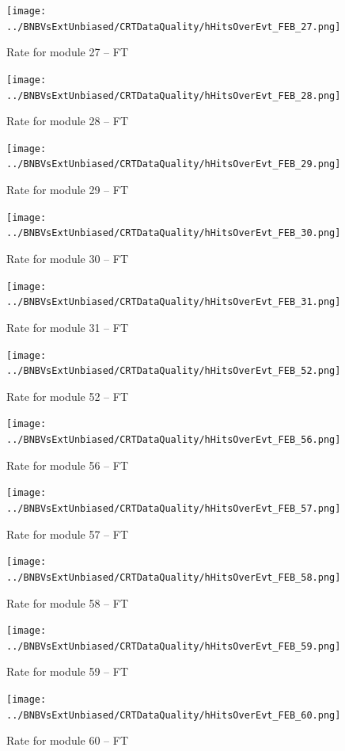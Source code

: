 \begin{figure}[h!]
\centering
\texttt{[image: ../BNBVsExtUnbiased/CRTDataQuality/hHitsOverEvt\_FEB\_27.png]}
\caption{Rate for module 27 -- FT}
\label{Annual27}
\end{figure}
\begin{figure}[h!]
\centering
\texttt{[image: ../BNBVsExtUnbiased/CRTDataQuality/hHitsOverEvt\_FEB\_28.png]}
\caption{Rate for module 28 -- FT}
\label{Annual28}
\end{figure}
\begin{figure}[h!]
\centering
\texttt{[image: ../BNBVsExtUnbiased/CRTDataQuality/hHitsOverEvt\_FEB\_29.png]}
\caption{Rate for module 29 -- FT}
\label{Annual29}
\end{figure}
\begin{figure}[h!]
\centering
\texttt{[image: ../BNBVsExtUnbiased/CRTDataQuality/hHitsOverEvt\_FEB\_30.png]}
\caption{Rate for module 30 -- FT}
\label{Annual30}
\end{figure}
\begin{figure}[h!]
\centering
\texttt{[image: ../BNBVsExtUnbiased/CRTDataQuality/hHitsOverEvt\_FEB\_31.png]}
\caption{Rate for module 31 -- FT}
\label{Annual31}
\end{figure}
\begin{figure}[h!]
\centering
\texttt{[image: ../BNBVsExtUnbiased/CRTDataQuality/hHitsOverEvt\_FEB\_52.png]}
\caption{Rate for module 52 -- FT}
\label{Annual52}
\end{figure}
\begin{figure}[h!]
\centering
\texttt{[image: ../BNBVsExtUnbiased/CRTDataQuality/hHitsOverEvt\_FEB\_56.png]}
\caption{Rate for module 56 -- FT}
\label{Annual56}
\end{figure}
\begin{figure}[h!]
\centering
\texttt{[image: ../BNBVsExtUnbiased/CRTDataQuality/hHitsOverEvt\_FEB\_57.png]}
\caption{Rate for module 57 -- FT}
\label{Annual57}
\end{figure}
\begin{figure}[h!]
\centering
\texttt{[image: ../BNBVsExtUnbiased/CRTDataQuality/hHitsOverEvt\_FEB\_58.png]}
\caption{Rate for module 58 -- FT}
\label{Annual58}
\end{figure}
\begin{figure}[h!]
\centering
\texttt{[image: ../BNBVsExtUnbiased/CRTDataQuality/hHitsOverEvt\_FEB\_59.png]}
\caption{Rate for module 59 -- FT}
\label{Annual59}
\end{figure}
\begin{figure}[h!]
\centering
\texttt{[image: ../BNBVsExtUnbiased/CRTDataQuality/hHitsOverEvt\_FEB\_60.png]}
\caption{Rate for module 60 -- FT}
\label{Annual60}
\end{figure}
